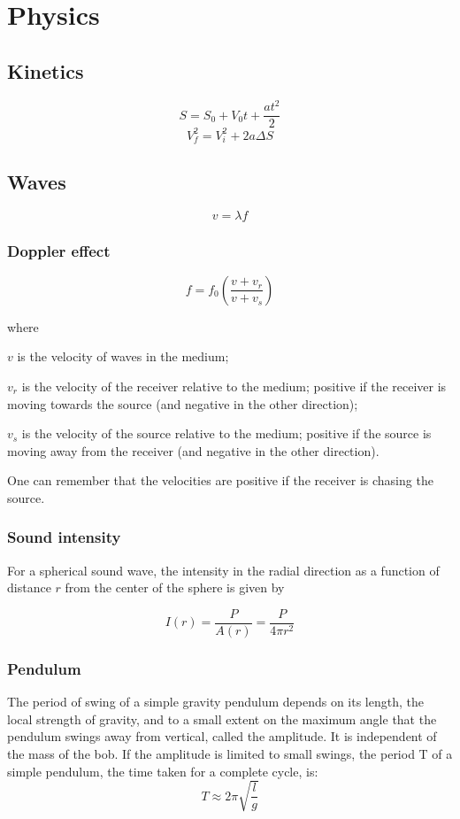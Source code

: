 \documentclass[12pt, oneside]{book}
\begin{document}
\part{Physics}

\chapter{Kinetics}
\[S = S_0 + V_0 t + \frac{a t^2}{2}\]
\[V_f^2 = V_i^2 + 2 a \Delta S\]

\chapter{Waves}
\[v = \lambda f\]

\section{Doppler effect}
\[f = f_0 \left ( \frac{v + v_r}{v + v_s} \right )\]

where

\(v\) is the velocity of waves in the medium;

\(v_r\) is the velocity of the receiver relative to the medium; positive if the
receiver is moving towards the source (and negative in the other direction);

\(v_s\) is the velocity of the source relative to the medium; positive if the
source is moving away from the receiver (and negative in the other direction).

One can remember that the velocities are positive if the receiver is chasing
the source.

\section{Sound intensity}
For a spherical sound wave, the intensity in the radial direction as a function
of distance \(r\) from the center of the sphere is given by

\[I(r) = \frac{P}{A(r)} = \frac{P}{4 \pi r^2}\]

\section{Pendulum}
The period of swing of a simple gravity pendulum depends on its length, the
local strength of gravity, and to a small extent on the maximum angle that the
pendulum swings away from vertical, called the amplitude. It is independent of
the mass of the bob. If the amplitude is limited to small swings, the period T
of a simple pendulum, the time taken for a complete cycle, is:
\[T \approx 2 \pi \sqrt{\frac{l}{g}}\]
\end{document}
